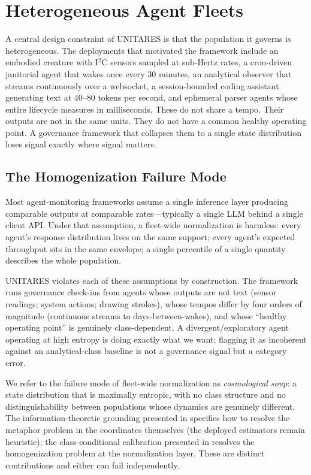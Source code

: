 \documentclass[11pt,twocolumn]{article}
\begin{document}
\section{Heterogeneous Agent Fleets}
\label{sec:heterogeneity}

A central design constraint of UNITARES is that the population it
governs is heterogeneous. The deployments that motivated the
framework include an embodied creature with I$^2$C sensors sampled
at sub-Hertz rates, a cron-driven janitorial agent that wakes once
every 30 minutes, an analytical observer that streams continuously
over a websocket, a session-bounded coding assistant generating
text at $40$--$80$ tokens per second, and ephemeral parser agents
whose entire lifecycle measures in milliseconds. These do not share
a tempo. Their outputs are not in the same units. They do not have
a common healthy operating point. A governance framework that
collapses them to a single state distribution loses signal exactly
where signal matters.

\subsection{The Homogenization Failure Mode}

Most agent-monitoring frameworks assume a single inference layer
producing comparable outputs at comparable rates---typically a
single LLM behind a single client API. Under that assumption, a
fleet-wide normalization is harmless: every agent's response
distribution lives on the same support; every agent's expected
throughput sits in the same envelope; a single percentile of a
single quantity describes the whole population.

UNITARES violates each of these assumptions by construction. The
framework runs governance check-ins from agents whose outputs are
not text (sensor readings; system actions; drawing strokes), whose
tempos differ by four orders of magnitude (continuous streams to
days-between-wakes), and whose ``healthy operating point'' is
genuinely class-dependent. A divergent/exploratory agent operating
at high entropy is doing exactly what we want; flagging it as
incoherent against an analytical-class baseline is not a governance
signal but a category error.

We refer to the failure mode of fleet-wide normalization as
\emph{cosmological soup}: a state distribution that is maximally
entropic, with no class structure and no distinguishability between
populations whose dynamics are genuinely different. The
information-theoretic grounding presented in
 specifies how to resolve the metaphor problem
in the coordinates themselves (the deployed estimators remain
heuristic); the class-conditional calibration
presented in  resolves the
homogenization problem at the normalization layer. These are
distinct contributions and either can fail independently.
\end{document}
